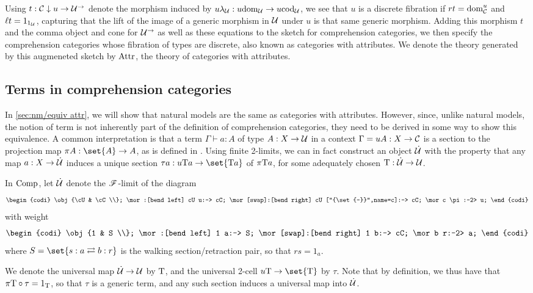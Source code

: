 \documentclass[../thesis.tex]{subfiles}
\begin{document}
Using $t : {\mathcal{C}} \mathrel{\downarrow} u \to {\mathcal{U}}^\to$ denote the morphism induced by $u\lambda_{\mathcal{U}} : u{\mathrm{dom}}_{\mathcal{U}} \to u{\mathrm{cod}}_{\mathcal{U}}$,
we see that $u$ is a discrete fibration if $rt = {\mathrm{dom}}^u_{\mathcal{C}}$ and $\ell t = 1_{1_{\mathcal{U}}}$, capturing that the lift
of the image of a generic morphism in ${\mathcal{U}}$ under $u$ is that same generic morphism. Adding this morphism $t$
and the comma object and cone for ${\mathcal{U}}^\to$ as well as these equations to the sketch for comprehension categories,
we then specify the comprehension categories whose fibration of types are discrete, also known as categories with
attributes. We denote the theory generated by this augmeneted sketch by ${\mathrm{Attr}}$, the theory of categories with
attributes.

\subsection{Terms in comprehension categories}\label{subsec:compcat terms}
In \cref{sec:nm/equiv attr}, we will show that natural models are the same as categories with attributes. However,
since, unlike natural models, the notion of term is not inherently part of the definition of comprehension categories,
they need to be derived in some way to show this equivalence. A common interpretation is that a term $\Gamma \vdash a
: A$ of type $A : X \to {\mathcal{U}}$ in a context $\Gamma = uA : X \to {\mathcal{C}}$ is a section to the projection map $\pi A : \set{A}
\to A$, as is defined in \cite{jacobs1993}. Using finite 2-limits, we can in fact construct an object $\dot{{\mathcal{U}}}$ with the
property that any map $a : X \to \dot{{\mathcal{U}}}$ induces a unique section $\tau a : u\typ a \to \set{\typ a}$ of $\pi{{\mathrm{T}}} a$,
for some adequately chosen ${{\mathrm{T}}} : \dot{{\mathcal{U}}} \to {\mathcal{U}}$. 

\begin{definition}
  In ${\mathrm{Comp}}$, let $\dot{{\mathcal{U}}}$ denote the ${\mathscr{F}}$-limit of the diagram
  \[\begin{codi}
    \obj {\cU & \cC \\};
    \mor:[bend left] cU u:-> cC;
    \mor[swap]:[bend right] cU ["{\set{-}}",name=c]:-> cC;
    \mor c \pi:-2> u;
  \end{codi}\]
  with weight
  \[\begin{codi}
    \obj {1 & S \\};
    \mor:[bend left] 1 a:-> S;
    \mor[swap]:[bend right] 1 b:-> cC;
    \mor b r:-2> a;
  \end{codi}\]
  where $S = \set{s : a \rightleftarrows b : r}$ is the walking section/retraction pair, so that $rs = 1_a$.

  We denote the universal map $\dot{{\mathcal{U}}} \to {\mathcal{U}}$ by ${{\mathrm{T}}}$, and the universal 2-cell $u\typ \to \set{\typ}$
  by $\tau$. Note that by definition, we thus have that $\pi {{\mathrm{T}}} \circ \tau = 1_{{\mathrm{T}}}$, so that $\tau$ is
  a generic term, and any such section induces a universal map into $\dot{{\mathcal{U}}}$.
\end{definition}
\end{document}
